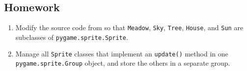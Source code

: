 \subsection{Homework}

\begin{enumerate}
	\item Modify the source code from  so that \texttt{Meadow}, \texttt{Sky}, \texttt{Tree}, \texttt{House}, and \texttt{Sun} are subclasses of \texttt{pygame.sprite.Sprite}.

	\item Manage all \texttt{Sprite} classes that implement an \texttt{update()} method in one \texttt{pygame\-.sprite\-.Group} object, and store the others in a separate group.
\end{enumerate}
